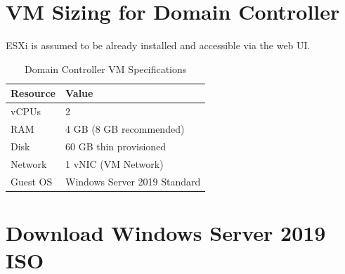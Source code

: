﻿\documentclass[12pt,a4paper]{article}
\begin{document}
\newpage
\tableofcontents
\newpage

\section{VM Sizing for Domain Controller}

\begin{tipbox}
ESXi is assumed to be already installed and accessible via the web UI.
\end{tipbox}

\begin{table}[H]
\centering
\begin{tabularx}{0.7\textwidth}{l X}
\toprule
\textbf{Resource} & \textbf{Value} \\
\midrule
vCPUs       & 2 \\
RAM         & 4 GB (8 GB recommended) \\
Disk        & 60 GB thin provisioned \\
Network     & 1 vNIC (VM Network) \\
Guest OS    & Windows Server 2019 Standard \\
\bottomrule
\end{tabularx}
\caption{Domain Controller VM Specifications}
\end{table}

\section{Download Windows Server 2019 ISO}
\end{document}
